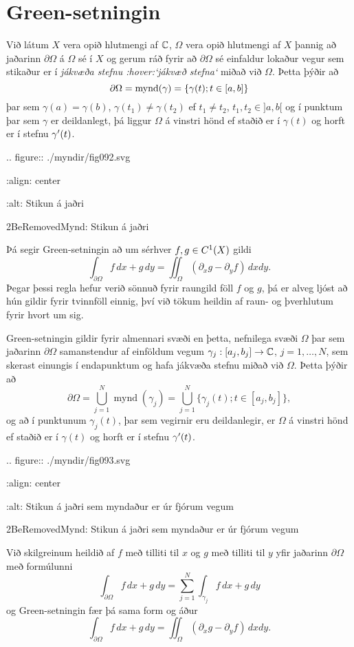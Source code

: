 \section{Green-setningin}

Við látum $X$ vera opið hlutmengi af ${\mathbb C}$, $\Omega$ vera opið hlutmengi
af $X$ þannig að jaðarinn $\partial\Omega$ á $\Omega$ sé í $X$ og gerum
ráð fyrir  að $\partial\Omega$  sé einfaldur lokaður vegur sem stikaður
er í {\it jákvæða stefnu :hover:`jákvæð stefna`} miðað við $\Omega$.
Þetta þýðir að 
$$ \partial\Omega={{\operatorname{mynd}(\gamma)}}=\{\gamma(t); t\in [a,b]\} $$
þar sem $\gamma(a)=\gamma(b)$, $\gamma(t_1)\neq \gamma(t_2)$ ef
$t_1\neq t_2$, $t_1,t_2\in ]a,b[$ og í punktum þar sem $\gamma$ er
deildanlegt, þá liggur $\Omega$ á vinstri hönd ef staðið er í 
$\gamma(t)$  og horft er í stefnu $\gamma{\sp{\prime}}(t)$.

.. figure:: ./myndir/fig092.svg

    :align: center

    :alt:  Stikun á jaðri 

    2BeRemovedMynd:  Stikun á jaðri 


\noindent Þá segir Green-setningin að um sérhver $f,g\in C\sp 1(X)$ gildi
 $$\int_{\partial\Omega} f\, dx +g \, dy =\iint_\Omega(\partial_x
g-\partial_y f)\, dxdy.
 $$
Þegar þessi regla hefur verið sönnuð fyrir raungild föll $f$ og $g$,
þá er alveg ljóst að hún gildir fyrir tvinnföll einnig, því við tökum
heildin af raun- og þverhlutum fyrir hvort um sig.

Green-setningin  gildir fyrir almennari svæði en þetta, nefnilega svæði
$\Omega$ þar sem jaðarinn $\partial\Omega$ samanstendur af einföldum
vegum $\gamma_j:[a_j,b_j]\to {\mathbb C}$, $j=1,\dots,N$, 
sem skerast einungis í endapunktum og
hafa jákvæða stefnu miðað við $\Omega$.  Þetta þýðir að 
 $$\partial\Omega=\bigcup\limits_{j=1}^N\operatorname{mynd} (\gamma_j)=
\bigcup\limits_{j=1}^N \{\gamma_j(t); t\in [a_j,b_j]\},
 $$
og að í punktunum $\gamma_j(t)$, þar sem vegirnir eru deildanlegir, er
$\Omega$ á vinstri hönd ef staðið er í 
$\gamma(t)$  og horft er í stefnu $\gamma{\sp{\prime}}(t)$.

.. figure:: ./myndir/fig093.svg

    :align: center

    :alt: Stikun á jaðri sem myndaður er
úr fjórum vegum

    2BeRemovedMynd: Stikun á jaðri sem myndaður er
úr fjórum vegum


\noindent
Við skilgreinum heildið  af $f$  með
tilliti til $x$ og $g$ með tilliti til $y$ yfir jaðarinn
$\partial\Omega$ með formúlunni
 $$\int_{\partial\Omega}f\, dx + g\, dy =\sum_{j=1}^N \int_{\gamma_j}f
\, dx + g\, dy
 $$
og Green-setningin fær þá sama form og áður
 $$\int_{\partial\Omega}f\, dx+g\, dy =\iint_\Omega
(\partial_xg-\partial_yf)\, dxdy.
 $$


